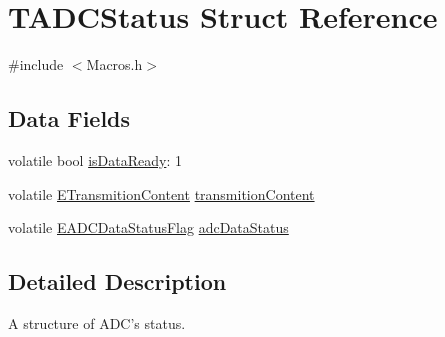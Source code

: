 \hypertarget{struct_t_a_d_c_status}{\section{T\-A\-D\-C\-Status Struct Reference}
\label{struct_t_a_d_c_status}
}


{\ttfamily \#include $<$Macros.\-h$>$}

\subsection*{Data Fields}
\begin{DoxyCompactItemize}
\item 
volatile bool \hyperlink{struct_t_a_d_c_status_a185baa2f9ddba5ae8664b9855a9fea20}{is\-Data\-Ready}\-: 1
\item 
volatile \hyperlink{group___enum_grp_ga1cca30b0867e98d31885e58f552270e0}{E\-Transmition\-Content} \hyperlink{struct_t_a_d_c_status_a8105600ceed44c216de66a84ef690219}{transmition\-Content}
\item 
volatile \hyperlink{group___enum_grp_ga28f90ca377a944d61b5d7c95655e2d97}{E\-A\-D\-C\-Data\-Status\-Flag} \hyperlink{struct_t_a_d_c_status_a46b24bb1f6b819fdf3dd09cdbc30dda8}{adc\-Data\-Status}
\end{DoxyCompactItemize}


\subsection{Detailed Description}
A structure of A\-D\-C's status. 

